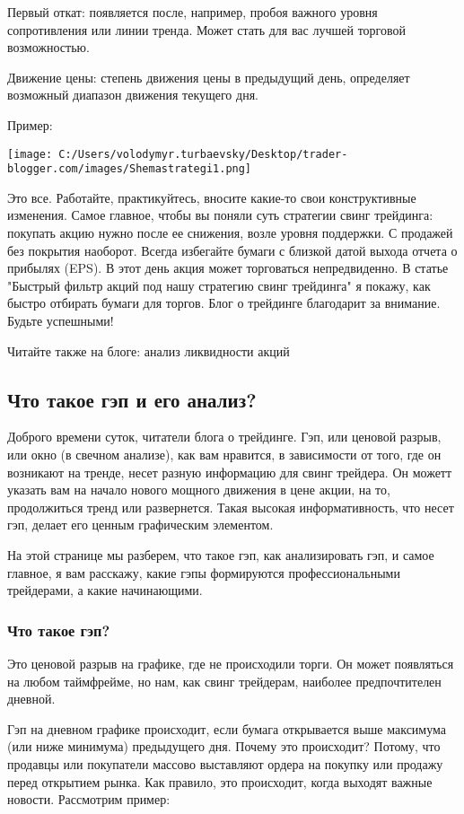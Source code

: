 \documentclass[a5paper]{article}
\begin{document}
Первый откат: появляется после, например, пробоя важного уровня сопротивления или линии тренда. Может стать для вас лучшей торговой возможностью.

Движение цены: степень движения цены в предыдущий день, определяет возможный диапазон движения текущего дня.

Пример:

\texttt{[image: C:/Users/volodymyr.turbaevsky/Desktop/trader-blogger.com/images/Shemastrategi1.png]}

Это все. Работайте, практикуйтесь, вносите какие-то свои конструктивные изменения. Самое главное, чтобы вы поняли суть стратегии свинг трейдинга: покупать акцию нужно после ее снижения, возле уровня поддержки. С продажей без покрытия наоборот. Всегда избегайте бумаги с близкой датой выхода отчета о прибылях (EPS). В этот день акция может торговаться непредвиденно. В статье "Быстрый фильтр акций под нашу стратегию свинг трейдинга" я покажу, как быстро отбирать бумаги для торгов. Блог о трейдинге благодарит за внимание. Будьте успешными!


Читайте также на блоге: анализ ликвидности акций

\subsection{Что такое гэп и его анализ?}

Доброго времени суток, читатели блога о трейдинге. Гэп, или ценовой разрыв, или окно (в свечном анализе), как вам нравится, в зависимости от того, где он возникают на тренде, несет разную информацию для свинг трейдера. Он можетт указать вам на начало нового мощного движения в цене акции, на то, продолжиться тренд или развернется. Такая высокая информативность, что несет гэп, делает его ценным графическим элементом.

На этой странице мы разберем, что такое гэп, как анализировать гэп, и
самое главное, я вам расскажу, какие гэпы формируются
профессиональными трейдерами, а какие начинающими.

\subsubsection{Что такое гэп?}

Это ценовой разрыв на графике, где не происходили торги. Он может появляться на любом таймфрейме, но нам, как свинг трейдерам, наиболее предпочтителен дневной.

Гэп на дневном графике происходит, если бумага открывается выше максимума (или ниже минимума) предыдущего дня. Почему это происходит? Потому, что продавцы или покупатели массово выставляют ордера на покупку или продажу перед открытием рынка. Как правило, это происходит, когда выходят важные новости. Рассмотрим пример:
\end{document}
